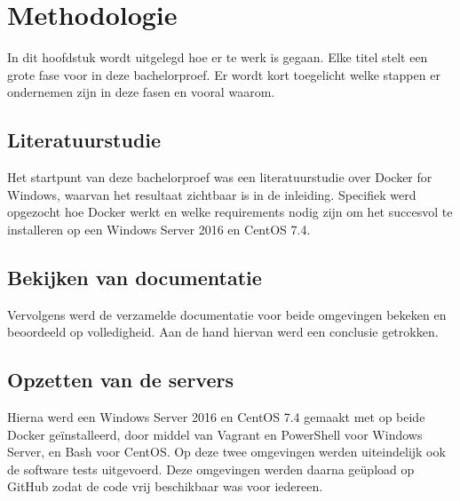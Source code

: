 
\chapter{Methodologie}
\label{ch:methodologie}


In dit hoofdstuk wordt uitgelegd hoe er te werk is gegaan. Elke titel stelt een grote fase voor in deze bachelorproef. Er wordt kort toegelicht welke stappen er ondernemen zijn in deze fasen en vooral waarom.

\section{Literatuurstudie}
Het startpunt van deze bachelorproef was een literatuurstudie over Docker for Windows, waarvan het resultaat zichtbaar is in de inleiding. Specifiek werd opgezocht hoe Docker werkt en welke requirements nodig zijn om het succesvol te installeren op een Windows Server 2016 en CentOS 7.4.

\section{Bekijken van documentatie}
Vervolgens werd de verzamelde documentatie voor beide omgevingen bekeken en beoordeeld op volledigheid. Aan de hand hiervan werd een conclusie getrokken.

\section{Opzetten van de servers}
Hierna werd een Windows Server 2016 en CentOS 7.4 gemaakt met op beide Docker geïnstalleerd, door middel van Vagrant en PowerShell voor Windows Server, en Bash voor CentOS. Op deze twee omgevingen werden uiteindelijk ook de software tests uitgevoerd. Deze omgevingen werden daarna geüpload op GitHub zodat de code vrij beschikbaar was voor iedereen.

